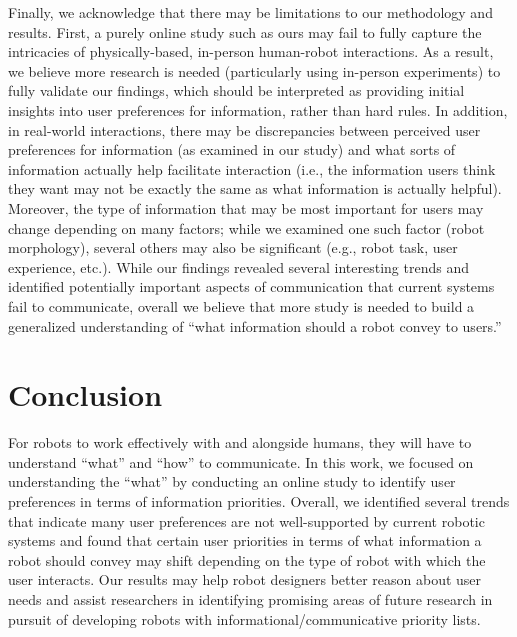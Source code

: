 \documentclass[letterpaper, 10 pt, conference]{ieeeconf}  %
\begin{document}
Finally, we acknowledge that there may be limitations to our methodology and results. First, a purely online study such as ours may fail to fully capture the intricacies of physically-based, in-person human-robot interactions. As a result, we believe more research is needed (particularly using in-person experiments) to fully validate our findings, which should be interpreted as providing initial insights into user preferences for information, rather than hard rules. In addition, in real-world interactions, there may be discrepancies between perceived user preferences for information (as examined in our study) and what sorts of information actually help facilitate interaction (i.e., the information users think they want may not be exactly the same as what information is actually helpful). Moreover, the type of information that may be most important for users may change depending on many factors; while we examined one such factor (robot morphology), several others may also be significant (e.g., robot task, user experience, etc.). While our findings revealed several interesting trends and identified potentially important aspects of communication that current systems fail to communicate, overall we believe that more study is needed to build a generalized understanding of ``what information should a robot convey to users.'' 


\section{Conclusion}
For robots to work effectively with and alongside humans, they will have to understand ``what'' and ``how'' to communicate. In this work, we focused on understanding the ``what'' by conducting an online study to identify user preferences in terms of information priorities. Overall, we identified several trends that indicate many user preferences are not well-supported by current robotic systems and found that certain user priorities in terms of what information a robot should convey may shift depending on the type of robot with which the user interacts. Our results may help robot designers better reason about user needs and assist researchers in identifying promising areas of future research in pursuit of developing robots with informational/communicative priority lists.
\end{document}
